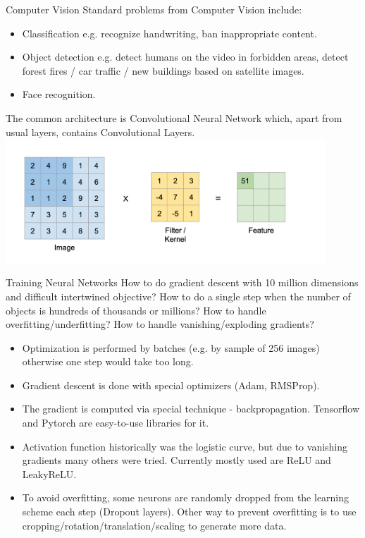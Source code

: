 \documentclass{beamer}
\theoremstyle{remark}
\begin{document}
\begin{frame}{Computer Vision}
    Standard problems from Computer Vision include: 
    \begin{itemize}
        \item Classification e.g. recognize handwriting, ban inappropriate content.
        \item Object detection e.g. detect humans on the video in forbidden areas, detect forest fires / car traffic / new buildings  based on satellite images.
        \item Face recognition.
    \end{itemize}
    
    The common architecture is Convolutional Neural Network which, apart from usual layers, contains Convolutional Layers.
    \includegraphics[width=0.9\textwidth]{pictures/convolution.png}
\end{frame}

\begin{frame}{Training Neural Networks}
    How to do gradient descent with 10 million dimensions and difficult intertwined objective? How to do a single step when the number of objects is hundreds of thousands or millions? How to handle overfitting/underfitting? How to handle vanishing/exploding gradients?\vspace{0.1in}
    
    \begin{itemize}
        \item Optimization is performed by batches (e.g. by sample of 256 images) otherwise one step would take too long.
        \item Gradient descent is done with special optimizers (Adam, RMSProp).
        \item The gradient is computed via special technique - backpropagation. Tensorflow and Pytorch are easy-to-use libraries for it.
        \item Activation function historically was the logistic curve, but due to vanishing gradients many others were tried. Currently mostly used are ReLU and LeakyReLU.
        \item To avoid overfitting, some neurons are randomly dropped from the learning scheme each step (Dropout layers). Other way to prevent overfitting is to use cropping/rotation/translation/scaling to generate more data.
    \end{itemize}
\end{frame}
\end{document}
